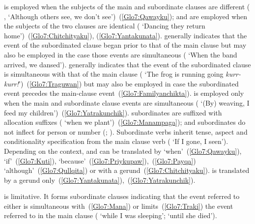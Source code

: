  is employed when the subjects of the main and subordinate clauses are different ( ,   ‘Although others see, we don’t see’)~(\ref{Glo7:Qawayku});  and  are employed when the subjects of the two clauses are identical (   ‘Dancing they return home’)~(\ref{Glo7:Chitchityaku}), (\ref{Glo7:Yantakunata}).  generally indicates that the event of the subordinated clause began prior to that of the main clause but may also be employed in the case those events are simultaneous (   ‘When the band arrived, we dansed’).  generally indicates that the event of the subordinated clause is simultaneous with that of the main clause (   ‘The frog is running going \emph{kurr-kurr!}’)~(\ref{Glo7:Traguwan}) but may also be employed in case the subordinated event precedes the main-clause event~(\ref{Glo7:Familyanchikta}).  is employed only when the main and subordinate clause events are simultaneous (   ‘(By) weaving, I feed my children’)~(\ref{Glo7:Yatrakunchik}).  subordinates are suffixed with allocation suffixes ( ‘when we plant’)~(\ref{Glo7:Manampaga});  and  subordinates do not inflect for person or number (; ). Subordinate verbs inherit tense, aspect and conditionality specification from the main clause verb (  ‘If I  gone, I  seen’). Depending on the context,  and  can be translated by ‘when’~(\ref{Glo7:Qawayku}), ‘if’~(\ref{Glo7:Kuti}), ‘because’~(\ref{Glo7:Priykupaw}),~(\ref{Glo7:Payqa}) ‘although’~(\ref{Glo7:Qullqita}) or with a gerund~(\ref{Glo7:Chitchityaku}).  is translated by a gerund only~(\ref{Glo7:Yantakunata}),~(\ref{Glo7:Yatrakunchik}).

 is limitative. It forms subordinate clauses indicating that the event referred to either is simultaneous with~(\ref{Glo7:Mana}) or limits~(\ref{Glo7:Traki}) the event referred to in the main clause ( ‘while I was sleeping’;  ‘until she died’).\\


